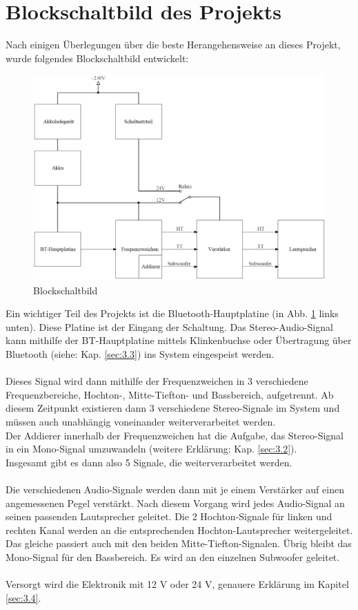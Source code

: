 \section{Blockschaltbild des Projekts}\label{sec:3.1}
Nach einigen Überlegungen über die beste Herangehensweise an dieses Projekt, wurde folgendes Blockschaltbild entwickelt:
\begin{figure} [H]
	\centering
	\includegraphics[width=1\textwidth]{img/blockschaltbild.png}
	\caption{Blockschaltbild}
	\label{fig:3.1.1}
\end{figure}
Ein wichtiger Teil des Projekts ist die Bluetooth-Hauptplatine (in Abb. \ref{fig:3.1.1} links unten).
Diese Platine ist der Eingang der Schaltung.
Das Stereo-Audio-Signal kann mithilfe der BT-Hauptplatine mittels Klinkenbuchse oder Übertragung über Bluetooth (siehe: Kap. \ref{sec:3.3}) ins System eingespeist werden.
\\ \\
Dieses Signal wird dann mithilfe der Frequenzweichen in 3 verschiedene Frequenzbereiche, Hochton-, Mitte-Tiefton- und Bassbereich, aufgetrennt.
Ab diesem Zeitpunkt existieren dann 3 verschiedene Stereo-Signale im System und müssen auch unabhängig voneinander weiterverarbeitet werden.
\\
Der Addierer innerhalb der Frequenzweichen hat die Aufgabe, das Stereo-Signal in ein Mono-Signal umzuwandeln (weitere Erklärung: Kap. \ref{sec:3.2}).
\\
Insgesamt gibt es dann also 5 Signale, die weiterverarbeitet werden.
\\ \\
Die verschiedenen Audio-Signale werden dann mit je einem Verstärker auf einen angemessenen Pegel verstärkt.
Nach diesem Vorgang wird jedes Audio-Signal an seinen passenden Lautsprecher geleitet.
Die 2 Hochton-Signale für linken und rechten Kanal werden an die entsprechenden Hochton-Lautsprecher weitergeleitet.
Das gleiche passiert auch mit den beiden Mitte-Tiefton-Signalen.
Übrig bleibt das Mono-Signal für den Bassbereich.
Es wird an den einzelnen Subwoofer geleitet.
\\ \\
Versorgt wird die Elektronik mit 12 V oder 24 V, genauere Erklärung im Kapitel \ref{sec:3.4}.

